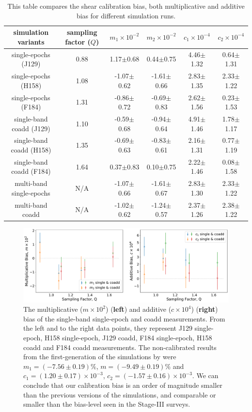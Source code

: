 \documentclass[fleqn,usenatbib]{mnras}
\begin{document}
\begin{table}
	\centering
	\begin{tabular}[width=\textwidth]{ c|c|c|c|c|c } 
		\hline
		simulation variants & sampling factor ($Q$) & $m_{1}\times10^{-2}$ & $m_{2}\times10^{-2}$ & $c_{1}\times10^{-4}$ & $c_{2}\times10^{-4}$\\
		\hline
		single-epochs (J129) & 0.88 & 1.17$\pm$0.68 & 0.44$\pm$0.75 & 4.46$\pm$1.32 & 0.64$\pm$1.31\\
		single-epochs (H158) & 1.08 & -1.07$\pm$0.62 & -1.61$\pm$0.66 & 2.83$\pm$1.35 & 2.33$\pm$1.22\\
		single-epochs (F184) & 1.31 & -0.86$\pm$0.72 & -0.69$\pm$0.83 & 2.62$\pm$1.56 & 0.23$\pm$1.53\\
		\hline
		single-band coadd (J129) & 1.10 & -0.59$\pm$0.68 & -0.94$\pm$0.64 & 4.91$\pm$1.46 & 1.78$\pm$1.17\\
		single-band coadd (H158) & 1.35 & -0.69$\pm$0.63 & -0.83$\pm$0.61 & 2.16$\pm$1.31 & 0.77$\pm$1.19\\
		single-band coadd (F184) & 1.64 & 0.37$\pm$0.83 & 0.10$\pm$0.75 & 2.22$\pm$1.46 & 0.08$\pm$1.58\\
		\hline
		multi-band single-epochs & N/A & -1.07$\pm$0.66 & -1.61$\pm$0.67 & 2.83$\pm$1.30 & 2.33$\pm$1.22 \\
		multi-band coadd & N/A & -1.02$\pm$0.62 & -1.24$\pm$0.57 & 2.37$\pm$1.26 & 2.38$\pm$1.22\\
		
		\hline
	\end{tabular}
	\caption{This table compares the shear calibration bias, both multiplicative and additive bias for different simulation runs.}
	\label{tab:bias_summary}
\end{table}

\begin{figure}
	\includegraphics[width=\textwidth]{final_result_v4.pdf}
    \caption{The multiplicative ($m \times 10^2$) (\textbf{left}) and additive ($c \times 10^4$) (\textbf{right}) bias of the single-band single-epoch and coadd measurements. From the left and to the right data points, they represent J129 single-epoch, H158 single-epoch, J129 coadd, F184 single-epoch, H158 coadd and F184 coadd measurements. The non-calibrated results from the first-generation of the simulations by \cite{2021MNRAS.501.2044T} were $m_1=(-7.56\pm0.19)\%$, $m=(-9.49\pm0.19)\%$ and $c_1=(1.20\pm0.17)\times10^{-3}$, $c_2=(-1.57\pm0.16)\times10^{-3}$. We can conclude that our calibration bias is an order of magnitude smaller than the previous versions of the simulations, and comparable or smaller than the bias-level seen in the Stage-III surveys.}
    \label{fig:final_result}
\end{figure}
\end{document}
